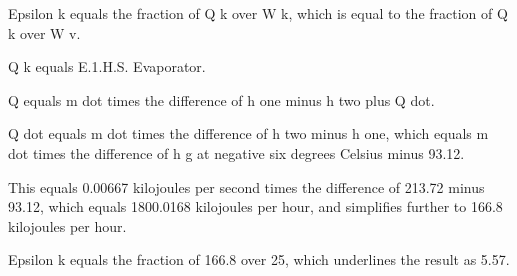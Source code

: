 Epsilon k equals the fraction of Q k over W k, which is equal to the fraction of Q k over W v.

Q k equals E.1.H.S. Evaporator.

Q equals m dot times the difference of h one minus h two plus Q dot.

Q dot equals m dot times the difference of h two minus h one, which equals m dot times the difference of h g at negative six degrees Celsius minus 93.12.

This equals 0.00667 kilojoules per second times the difference of 213.72 minus 93.12, which equals 1800.0168 kilojoules per hour, and simplifies further to 166.8 kilojoules per hour.

Epsilon k equals the fraction of 166.8 over 25, which underlines the result as 5.57.